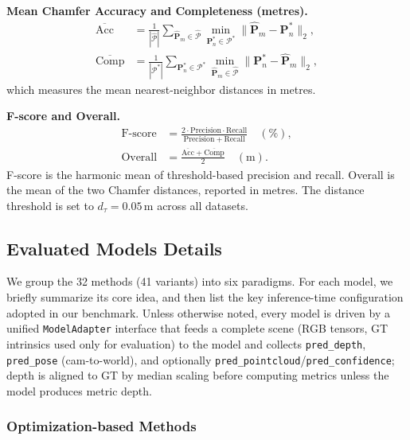 \documentclass{llmxive}
\begin{document}
\noindent\textbf{Mean Chamfer Accuracy and Completeness (metres).}
\begin{align}
  \overline{\mathrm{Acc}}
  &= \frac{1}{|\hat{\mathcal{P}}|}\sum_{\hat{\mathbf{P}}_m\in\hat{\mathcal{P}}}
    \min_{\mathbf{P}_n^{*}\in\mathcal{P}^{*}}\bigl\|\hat{\mathbf{P}}_m - 
    \mathbf{P}_n^{*}\bigr\|_2, \\
  \overline{\mathrm{Comp}}
  &= \frac{1}{|\mathcal{P}^{*}|}\sum_{\mathbf{P}_n^{*}\in\mathcal{P}^{*}}
    \min_{\hat{\mathbf{P}}_m\in\hat{\mathcal{P}}}\bigl\|\mathbf{P}_n^{*} - 
    \hat{\mathbf{P}}_m\bigr\|_2,
\end{align}
which measures the mean nearest-neighbor distances in metres.

\noindent\textbf{F-score and Overall.}
\begin{align}
  \text{F-score} &= \frac{2\cdot\mathrm{Precision}\cdot\mathrm{Recall}}
    {\mathrm{Precision}+\mathrm{Recall}}\quad(\%), \\
  \text{Overall}  &= \frac{\overline{\mathrm{Acc}}+\overline{\mathrm{Comp}}}{2}
    \quad(\mathrm{m}).
\end{align}
F-score is the harmonic mean of threshold-based precision and recall. 
Overall is the mean of the two Chamfer distances, reported in metres. 
The distance threshold is set to $d_{\tau}=0.05$\,m across all datasets.

\subsection{Evaluated Models Details}
\label{sec:model_overview}

We group the 32 methods (41 variants) into six paradigms.
%
For each model, we briefly summarize its core idea, and then list the key inference-time configuration adopted in our benchmark.
%
Unless otherwise noted, every model is driven by a unified \texttt{ModelAdapter} interface that feeds a complete scene (RGB tensors, GT intrinsics used only for evaluation) to the model and collects \texttt{pred\_depth}, \texttt{pred\_pose} (cam-to-world), and optionally \texttt{pred\_pointcloud}/\texttt{pred\_confidence}; depth is aligned to GT by median scaling before computing metrics unless the model produces metric depth.

\subsubsection{Optimization-based Methods}
\end{document}

